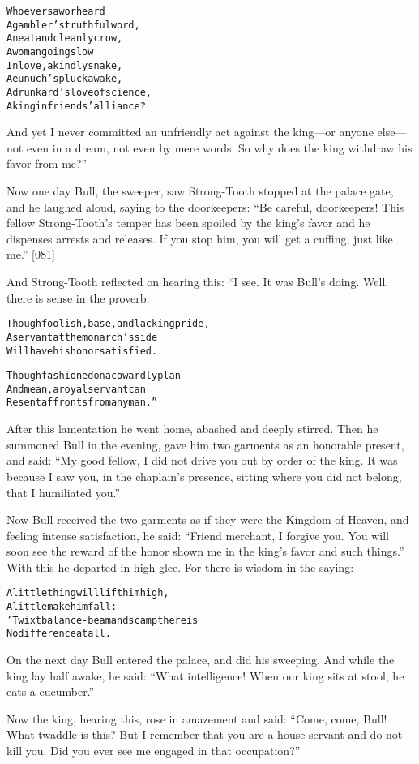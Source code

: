 \documentclass{article}
\renewenvironment{verbatim}{\begin{alltt}\normalfont\begin{centering}}{\end{centering}\end{alltt}}
\begin{document}
\begin{verbatim}
Who ever saw or heard
A gambler's truthful word,
A neat and cleanly crow,
A woman going slow
In love, a kindly snake,
A eunuch's pluck awake,
A drunkard's love of science,
A king in friends' alliance?
\end{verbatim}
And yet I never committed an unfriendly act against the king---or
anyone else---not even in a dream, not even by mere words. So why
does the king withdraw his favor from me?”

Now one day Bull, the sweeper, saw Strong-Tooth stopped at the
palace gate, and he laughed aloud, saying to the doorkeepers:
``Be careful, doorkeepers! This fellow Strong-Tooth's temper has been spoiled by the king's favor and he dispenses arrests and releases. If you stop him, you will get a cuffing, just like me.''
[081]

And Strong-Tooth reflected on hearing this: “I see. It was Bull's
doing. Well, there is sense in the proverb:

\begin{verbatim}
Though foolish, base, and lacking pride,
A servant at the monarch's side
Will have his honor satisfied.

Though fashioned on a cowardly plan
And mean, a royal servant can
Resent affronts from any man.”
\end{verbatim}
After this lamentation he went home, abashed and deeply stirred.
Then he summoned Bull in the evening, gave him two garments as an
honorable present, and said:
``My good fellow, I did not drive you out by order of the king. It was because I saw you, in the chaplain's presence, sitting where you did not belong, that I humiliated you.''

Now Bull received the two garments as if they were the Kingdom of
Heaven, and feeling intense satisfaction, he said:
``Friend merchant, I forgive you. You will soon see the reward of the honor shown me in the king's favor and such things.''
With this he departed in high glee. For there is wisdom in the
saying:

\begin{verbatim}
A little thing will lift him high,
    A little make him fall:
'Twixt balance-beam and scamp there is
    No difference at all.
\end{verbatim}
On the next day Bull entered the palace, and did his sweeping. And
while the king lay half awake, he said:
``What intelligence! When our king sits at stool, he eats a cucumber.''

Now the king, hearing this, rose in amazement and said:
``Come, come, Bull! What twaddle is this? But I remember that you are a house-servant and do not kill you. Did you ever see me engaged in that occupation?''
\end{document}
